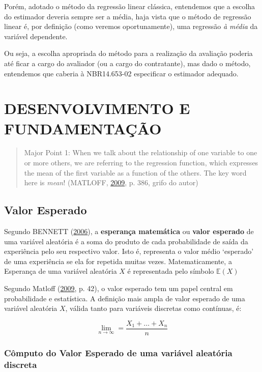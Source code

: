 \documentclass[a4paper, 12pt]{article}
\begin{document}
Porém, adotado o método da regressão linear clássica, entendemos que a
escolha do estimador deveria sempre ser a média, haja vista que o método
de regressão linear é, por definição (como veremos oportunamente), uma
regressão \emph{à média} da variável dependente.

Ou seja, a escolha apropriada do método para a realização da avaliação
poderia até ficar a cargo do avaliador (ou a cargo do contratante), mas
dado o método, entendemos que caberia à NBR14.653-02 especificar o
estimador adequado.

\section{DESENVOLVIMENTO E
FUNDAMENTAÇÃO}\label{desenvolvimento-e-fundamentacao}

\begin{quote}
Major Point 1: When we talk about the relationship of one variable to
one or more others, we are referring to the regression function, which
expresses the mean of the first variable as a function of the others.
The key word here is \emph{mean}! (MATLOFF,
\protect\hyperlink{ref-matloff2009}{2009}, p. 386, grifo do autor)
\end{quote}

\subsection{Valor Esperado}\label{valor-esperado}

Segundo BENNETT (\protect\hyperlink{ref-bennett}{2006}), a
\textbf{esperança matemática} ou \textbf{valor esperado } de uma
variável aleatória é a soma do produto de cada probabilidade de saída da
experiência pelo seu respectivo valor. Isto é, representa o valor médio
`esperado' de uma experiência se ela for repetida muitas vezes.
Matematicamente, a Esperança de uma variável aleatória \(X\) é
representada pelo símbolo \(\mathbb{E}(X)\)

Segundo Matloff (\protect\hyperlink{ref-matloff2009}{2009}, p. 42), o
valor esperado tem um papel central em probabilidade e estatística. A
definição mais ampla de valor esperado de uma variável aleatória \(X\),
válida tanto para variáveis discretas como contínuas, é:

\[\lim_{n \to \infty} = \frac{X_1 + \ldots + X_n}{n}\]

\subsubsection{Cômputo do Valor Esperado de uma variável aleatória
discreta}\label{computo-do-valor-esperado-de-uma-variavel-aleatoria-discreta}
\end{document}
